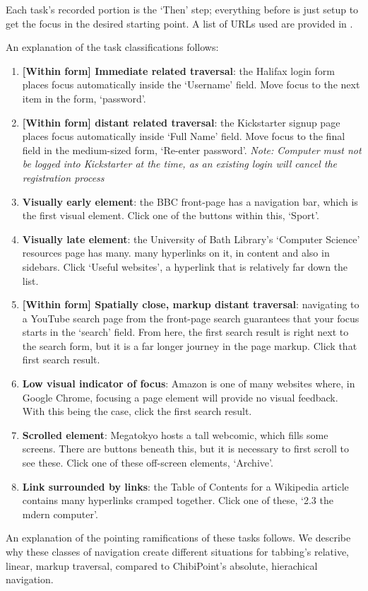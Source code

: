\documentclass[a4paper, 12pt]{report}
\begin{document}
Each task's recorded portion is the `Then' step; everything before is just setup to get the focus in the desired starting point. A list of URLs used are provided in .

An explanation of the task classifications follows:

\newcommand{\TaskDef}[2]{\item \textbf{#1}: #2}

\begin{enumerate}
	\TaskDef{[Within form] Immediate related traversal}{the Halifax login form places focus automatically inside the `Username' field. Move focus to the next item in the form, `password'.}
	\TaskDef{[Within form] distant related traversal}{the Kickstarter signup page places focus automatically inside `Full Name' field. Move focus to the final field in the medium-sized form, `Re-enter password'. \textit{Note: Computer must not be logged into Kickstarter at the time, as an existing login will cancel the registration process}}
	\TaskDef{Visually early element}{the BBC front-page has a navigation bar, which is the first visual element. Click one of the buttons within this, `Sport'.}
	\TaskDef{Visually late element}{the University of Bath Library's `Computer Science' resources page has many. 
	many hyperlinks on it, in content and also in sidebars. Click `Useful websites', a hyperlink that is relatively far down the list.}
	\TaskDef{[Within form] Spatially close, markup distant traversal}{navigating to a YouTube search page from the front-page search guarantees that your focus starts in the `search' field. From here, the first search result is right next to the search form, but it is a far longer journey in the page markup. Click that first search result.}
	\TaskDef{Low visual indicator of focus}{Amazon is one of many websites where, in Google Chrome, focusing a page element will provide no visual feedback. With this being the case, click the first search result.}
	\TaskDef{Scrolled element}{Megatokyo hosts a tall webcomic, which fills some screens. There are buttons beneath this, but it is necessary to first scroll to see these. Click one of these off-screen elements, `Archive'.}
	\TaskDef{Link surrounded by links}{the Table of Contents for a Wikipedia article contains many hyperlinks cramped together. Click one of these, `2.3 the mdern computer'.}
\end{enumerate}

An explanation of the pointing ramifications of these tasks follows. We describe why these classes of navigation create different situations for tabbing's relative, linear, markup traversal, compared to ChibiPoint's absolute, hierachical navigation.
\end{document}
